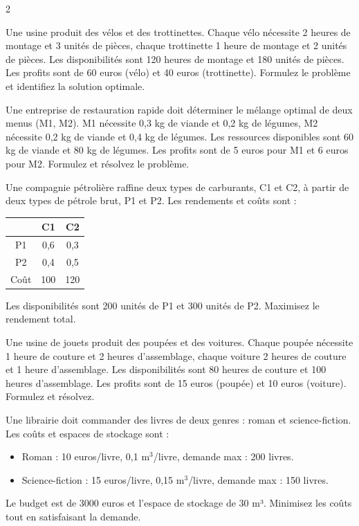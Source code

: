 \begin{multicols}{2}
\begin{exercice}
	Une usine produit des vélos et des trottinettes. Chaque vélo nécessite 2 heures de montage et 3 unités de pièces, chaque trottinette 1 heure de montage et 2 unités de pièces. Les disponibilités sont 120 heures de montage et 180 unités de pièces. Les profits sont de 60 euros (vélo) et 40 euros (trottinette). Formulez le problème et identifiez la solution optimale.
\end{exercice}

\begin{exercice}
	Une entreprise de restauration rapide doit déterminer le mélange optimal de deux menus (M1, M2). M1 nécessite 0,3 kg de viande et 0,2 kg de légumes, M2 nécessite 0,2 kg de viande et 0,4 kg de légumes. Les ressources disponibles sont 60 kg de viande et 80 kg de légumes. Les profits sont de 5 euros pour M1 et 6 euros pour M2. Formulez et résolvez le problème.
\end{exercice}

\begin{exercice}
	Une compagnie pétrolière raffine deux types de carburants, C1 et C2, à partir de deux types de pétrole brut, P1 et P2. Les rendements et coûts sont :
	\begin{center}
		\begin{tabular}{c|cc}
			& C1 & C2 \\
			\hline
			P1 & 0,6 & 0,3 \\
			P2 & 0,4 & 0,5 \\
			Coût & 100 & 120 \\
		\end{tabular}
	\end{center}
	Les disponibilités sont 200 unités de P1 et 300 unités de P2. Maximisez le rendement total.
\end{exercice}

\begin{exercice}
	Une usine de jouets produit des poupées et des voitures. Chaque poupée nécessite 1 heure de couture et 2 heures d'assemblage, chaque voiture 2 heures de couture et 1 heure d'assemblage. Les disponibilités sont 80 heures de couture et 100 heures d'assemblage. Les profits sont de 15 euros (poupée) et 10 euros (voiture). Formulez et résolvez.
\end{exercice}

\begin{exercice}
	Une librairie doit commander des livres de deux genres : roman et science-fiction. Les coûts et espaces de stockage sont :
	\begin{itemize}
		\item Roman : 10 euros/livre, 0,1 m$^{3}$/livre, demande max : 200 livres.
		\item Science-fiction : 15 euros/livre, 0,15 m$^{3}$/livre, demande max : 150 livres.
	\end{itemize}
	Le budget est de 3000 euros et l'espace de stockage de 30 m³. Minimisez les coûts tout en satisfaisant la demande.
\end{exercice}


\end{multicols}

